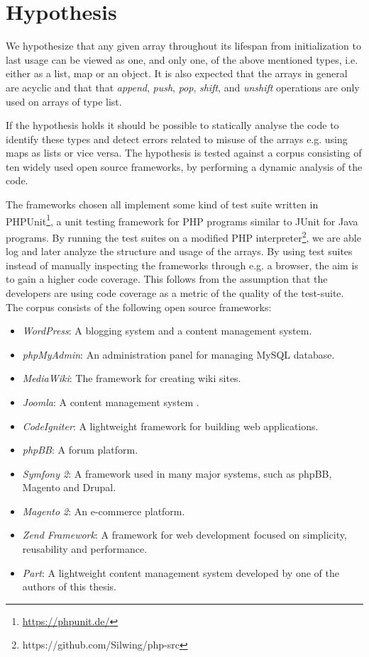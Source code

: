 \section{Hypothesis}
\label{sec:dynhypothesis}
We hypothesize that any given array throughout its lifespan from initialization to last usage can be viewed as one, and only one, of the above mentioned types, i.e. either as a list, map or an object. It is also expected that the arrays in general are acyclic and that that \emph{append}, \textit{push}, \textit{pop}, \textit{shift}, and \textit{unshift} operations are only used on arrays of type list.

If the hypothesis holds it should be possible to statically analyse the code to identify these types and detect errors related to misuse of the arrays e.g. using maps as lists or vice versa. The hypothesis is tested against a corpus consisting of ten widely used open source frameworks, by performing a dynamic analysis of the code.

The frameworks chosen all implement some kind of test suite written in PHPUnit\footnote{\url{https://phpunit.de/}}, a unit testing framework for PHP programs similar to JUnit for Java programs. By running the test suites on a modified PHP interpreter\footnote{https://github.com/Silwing/php-src}, we are able log and later analyze the structure and usage of the arrays. By using test suites instead of manually inspecting the frameworks through e.g. a browser, the aim is to gain a higher code coverage. This follows from the assumption that the developers are using code coverage as a metric of the quality of the test-suite. The corpus consists of the following open source frameworks:

\begin{itemize}
    \item \emph{WordPress}: A blogging system and a content management system.
    \item \emph{phpMyAdmin}: An administration panel for managing MySQL database.
    \item \emph{MediaWiki}: The framework for creating wiki sites.
    \item \emph{Joomla}: A content management system .
    \item \emph{CodeIgniter}: A lightweight framework for building web applications.
    \item \emph{phpBB}: A forum platform.
    \item \emph{Symfony 2}: A framework used in many major systems, such as phpBB, Magento and Drupal.
    \item \emph{Magento 2}: An e-commerce platform.
    \item \emph{Zend Framework}: A framework for web development focused on simplicity, reusability and performance.
    \item \emph{Part}: A lightweight content management system developed by one of the authors of this thesis.
\end{itemize}